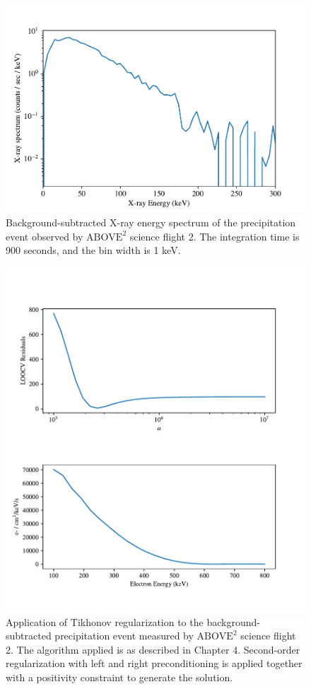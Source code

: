 \begin{figure}[p]
    \centering
    \includegraphics[width=1.0\textwidth]{figures/chapter_5/abv2_hist/abv2_hist}
    \caption{Background-subtracted X-ray energy spectrum of the precipitation event observed by $\text{ABOVE}^2$ science flight 2. The integration time is 900 seconds, and the bin width is 1 keV.}
    \label{abv2_hist}
\end{figure}

\begin{figure}[p]
    \centering
    \includegraphics[width=1.0\textwidth]{figures/chapter_5/abv2_tk_inv/abv2_tk_inv_3}
    \caption{Application of Tikhonov regularization to the background-subtracted precipitation event measured by $\text{ABOVE}^2$ science flight 2. The algorithm applied is as described in Chapter 4. Second-order regularization with left and right preconditioning is applied together with a positivity constraint to generate the solution.}
    \label{abv2_tk_inv}
\end{figure}

